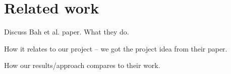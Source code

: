 \section{Related work} %
\label{sec:related_work}

Discuss Bah et al.\cite{bah-idp2015} paper. What they do.

How it relates to our project -- we got the project idea from their paper.

How our results/approach compares to their work.

